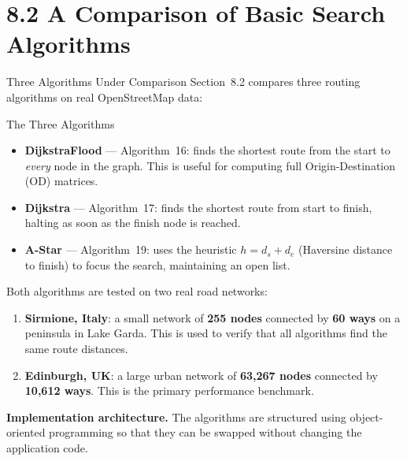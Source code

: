 \documentclass[aspectratio=169,10pt]{beamer}
\begin{document}
\section{8.2 A Comparison of Basic Search Algorithms}

\begin{frame}[allowframebreaks]{Three Algorithms Under Comparison}
  Section~8.2 compares three routing algorithms on real OpenStreetMap data:

  \begin{block}{The Three Algorithms}
    \begin{itemize}
      \item \textbf{DijkstraFlood} --- Algorithm~16: finds the shortest
        route from the start to \emph{every} node in the graph.  This is
        useful for computing full Origin-Destination (OD) matrices.
      \item \textbf{Dijkstra} --- Algorithm~17: finds the shortest route
        from start to finish, halting as soon as the finish node is
        reached.
      \item \textbf{A-Star} --- Algorithm~19: uses the heuristic
        $h = d_s + d_e$ (Haversine distance to finish) to focus the
        search, maintaining an open list.
    \end{itemize}
  \end{block}

  \medskip
  Both algorithms are tested on two real road networks:

  \begin{enumerate}
    \item \textbf{Sirmione, Italy}: a small network of \textbf{255 nodes}
      connected by \textbf{60 ways} on a peninsula in Lake Garda.  This is
      used to verify that all algorithms find the same route distances.
    \item \textbf{Edinburgh, UK}: a large urban network of \textbf{63,267
      nodes} connected by \textbf{10,612 ways}.  This is the primary
      performance benchmark.
  \end{enumerate}

  \framebreak

  \textbf{Implementation architecture.}
  The algorithms are structured using object-oriented programming so that
  they can be swapped without changing the application code.


\end{frame}
\end{document}

